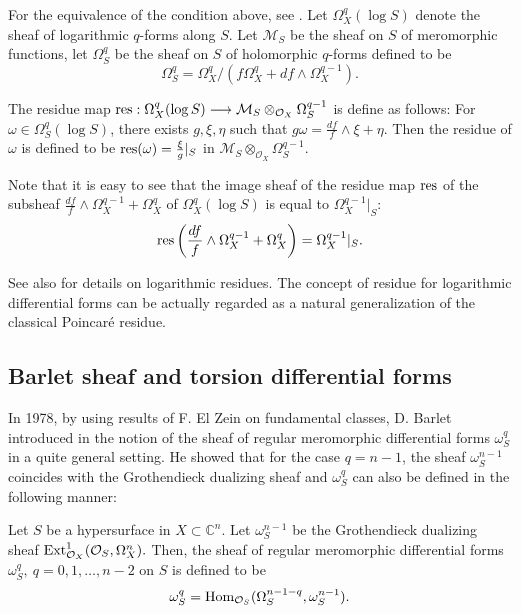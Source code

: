 \documentclass[pdftex]{arxsigma}
\begin{document}
For the equivalence of the condition above, see \cite{S}. 
Let $ \Omega_X^{q}(\log S) $ denote the sheaf of logarithmic $q$-forms along $S$.
Let $ {\mathcal M}_{S} $ be the sheaf on $S$ of meromorphic functions, let $ \Omega_{S}^{q} $ be the sheaf on $S$ of holomorphic $q$-forms defined to be 
\begin{equation*}
\Omega_{S}^{q} = \Omega_{X}^{q}/(f\Omega_X^{q} + df \wedge \Omega_{X}^{q-1}). 
\end{equation*}


\begin{definition}
The residue map $ {\rm res} : \Omega_X^{q}(\log S) \longrightarrow {\mathcal M}_S \otimes_{{\mathcal O}_X}\Omega_S^{q-1} $ is define as follows:
For $ \omega \in \Omega_S^{q}(\log S) $, there exists $ g, \xi, \eta $ such that 
$  {\displaystyle g\omega = \frac{df}{f} \wedge \xi + \eta}. $ Then 
the residue of $\omega$ is defined to be
$ {\rm res}(\omega) = \frac{\xi}{g}|_S $ in $ {\mathcal M}_S \otimes_{{\mathcal O}_X}\Omega_S^{q-1}. $
\end{definition}


Note that it is easy to see that the image sheaf of the residue map $ {\rm res} $ of the subsheaf $ \displaystyle{ \frac{df}{f}\wedge \Omega_X^{q-1} + \Omega_X^{q}} $ of $ \Omega_X^{q}(\log S) $ is equal to $ \Omega_X^{q-1}|_S:$
\begin{equation*}
 {\rm res}\left( \frac{df}{f}\wedge \Omega_X^{q-1} + \Omega_X^{q}\right) = \Omega_X^{q-1}|_S. 
\end{equation*}


See also \cite{S} for details on logarithmic residues. 
The concept of residue for logarithmic differential forms can be actually regarded as a natural generalization of the classical Poincar\'e residue. 

\subsection{Barlet sheaf and torsion differential forms}

In 1978, by using results of F. El Zein on fundamental classes, D. Barlet introduced in \cite{B} the notion of the sheaf of regular meromorphic differential forms $\omega_S^{q} $ in a  quite general setting. He showed that for the case $q=n-1$, the sheaf $ \omega_S^{n-1}$ coincides with the 
Grothendieck dualizing sheaf and $ \omega_S^{q} $ can also be defined in the following manner:

\begin{definition}
 Let $S$ be a hypersurface  in $X \subset {\mathbb C}^n. $ Let $ \omega_S^{n-1} $ be the Grothendieck dualizing sheaf $ {\rm Ext}_{{\mathcal O}_X}^{1}({\mathcal O}_S, \Omega_X^{n}). $ Then, the sheaf of regular meromorphic differential forms $ \omega_S^{q}, \ q=0,1,\dots, n-2$ on $S$ is defined to be
\begin{equation*}
 \omega_S^{q} = {\rm Hom}_{{\mathcal O}_S}(\Omega_S^{n-1-q}, \omega_S^{n-1}). 
\end{equation*}

\end{definition}
\end{document}
